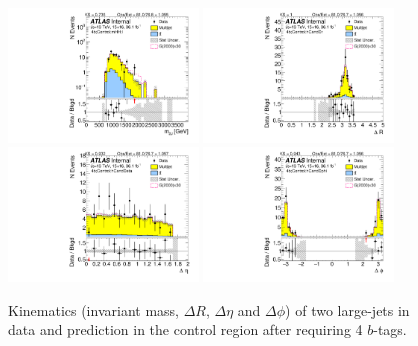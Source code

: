 \begin{figure}[htbp!]
\begin{center}
\includegraphics[width=0.45\textwidth,angle=-90]{figures/boosted/Control/b77_FourTag_Control_mHH_l_1.pdf}
\includegraphics[width=0.45\textwidth,angle=-90]{figures/boosted/Control/b77_FourTag_Control_hCandDr.pdf}\\
\includegraphics[width=0.45\textwidth,angle=-90]{figures/boosted/Control/b77_FourTag_Control_hCandDeta.pdf}
\includegraphics[width=0.45\textwidth,angle=-90]{figures/boosted/Control/b77_FourTag_Control_hCandDphi.pdf}
  \caption{Kinematics (invariant mass, $\Delta R$, $\Delta \eta$ and $\Delta \phi$) of two large-\R jets in data and prediction in the control region after requiring 4 $b$-tags.  }
  \label{fig:boosted-4b-control-ak10-system}
\end{center}
\end{figure}

